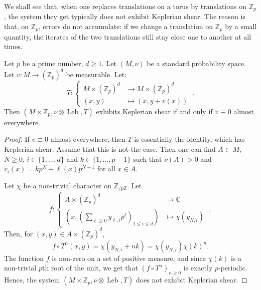 \documentclass[10pt]{amsart}
\theoremstyle{definition}\newtheorem{defi}[theo]{Definition}\newtheorem{rema}[theo]{Remark}\newtheorem{exam}[theo]{Example}\newtheorem{exem}[theo]{Example}\newtheorem{nota}[theo]{Notation}
\DeclareMathOperator{\Leb}{Leb}
\newcommand{\Z}{\mathbb{Z}}
\newcommand{\Cbb}{\mathbb{C}}
\begin{document}

We shall see that, when one replaces translations on a torus by translations on $\Z_p$, the system they get typically does not exhibit Keplerian shear. The reason is that, on $\Z_p$, errors do not accumulate: if we change a translation on $\Z_p$ by a small quantity, the iterates of the two translations still stay close one to another at all times.


\begin{prop}
Let $p$ be a prime number, $d \geq 1$. Let $(M, \nu)$ be a standard probability space. Let $v : M \to (\Z_p)^d$ be measurable. Let:
\[
T :
\begin{cases}
M \times (\Z_p)^d & \to M \times (\Z_p)^d \\
(x,y) & \mapsto (x,y+v(x))
\end{cases}
\;.
\]
Then $(M \times \Z_p, \nu \otimes \Leb, T)$ exhibits Keplerian shear if and only if $v \equiv 0$ almost everywhere.
\end{prop}



\begin{proof}
If $v \equiv 0$ almost everywhere, then $T$ is essentially the identity, which has Keplerian shear. Assume that this is not the case. Then one can find $A \subset M$, $N \geq 0$, $i \in \{1, \ldots, d\}$ and $k \in \{1, \ldots, p-1\}$ such that $\nu(A) >0$ and $v_i (x) = k p^N+\ell(x) p^{N+1}$ for all $x \in A$.


Let $\chi$ be a non-trivial character on $\Z_{/p\Z}$. Let
\[
f : \begin{cases}
A \times (\Z_p)^d & \to \Cbb \\
\left(x,\left(\sum_{\ell \geq 0} y_{\ell,i} p^\ell\right)_{1 \leq i \leq d} \right) & \mapsto \chi(y_{N,i})
\end{cases}
\;,
\]
Then, for $(x,y) \in A \times (\Z_p)^d$,
\[
f \circ T^n (x,y) = \chi(y_{N,i}+nk) = \chi(y_{N,i})\chi(k)^n.
\]
The function $f$ is non-zero on a set of positive measure, and since $\chi(k)$ is a non-trivial $p$th root of the unit, we get that $(f \circ T^n)_{n \geq 0}$ is exactly $p$-periodic. Hence, the system $(M \times \Z_p, \nu \otimes \Leb, T)$ does not exhibit Keplerian shear.
\end{proof}
\end{document}
